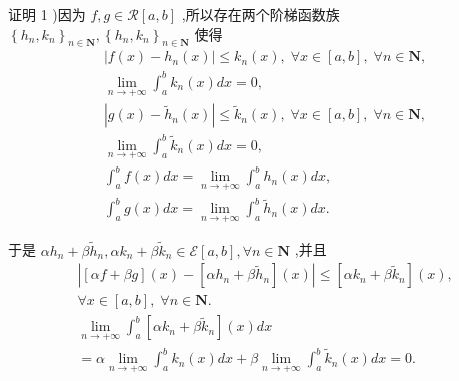证明 1 )因为 $f,g \in  \mathcal{R}\left\lbrack  {a,b}\right\rbrack$ ,所以存在两个阶梯函数族 ${\left\{  {h}_{n},{k}_{n}\right\}  }_{n \in  \mathbf{N}},{\left\{  {h}_{n},{k}_{n}\right\}  }_{n \in  \mathbf{N}}$ 使得
\begin{align*}
	&\left| {f\left( x\right)  - {h}_{n}\left( x\right) }\right|  \leq  {k}_{n}\left( x\right) ,\;\forall x \in  \left\lbrack  {a,b}\right\rbrack  ,\;\forall n \in  \mathbf{N},\\
	&\mathop{\lim }\limits_{{n \rightarrow   + \infty }}{\int }_{a}^{b}{k}_{n}\left( x\right) {dx} = 0,\\
	&\left| {g\left( x\right)  - {\widetilde{h}}_{n}\left( x\right) }\right|  \leq  {\widetilde{k}}_{n}\left( x\right) ,\;\forall x \in  \left\lbrack  {a,b}\right\rbrack  ,\;\forall n \in  \mathbf{N},\\
	&\mathop{\lim }\limits_{{n \rightarrow   + \infty }}{\int }_{a}^{b}{\widetilde{k}}_{n}\left( x\right) {dx} = 0,\\
	&{\int }_{a}^{b}f\left( x\right) {dx} = \mathop{\lim }\limits_{{n \rightarrow   + \infty }}{\int }_{a}^{b}{h}_{n}\left( x\right) {dx},\\
	&{\int }_{a}^{b}g\left( x\right) {dx} = \mathop{\lim }\limits_{{n \rightarrow   + \infty }}{\int }_{a}^{b}{\widetilde{h}}_{n}\left( x\right) {dx}.
\end{align*}

于是 $\alpha {h}_{n} + \beta {\widetilde{h}}_{n},\alpha {k}_{n} + \beta {\widetilde{k}}_{n} \in  \mathcal{E}\left\lbrack  {a,b}\right\rbrack  ,\forall n \in  \mathbf{N}$ ,并且
\begin{align*}
	&\left| {\left\lbrack  {{\alpha f} + {\beta g}}\right\rbrack  \left( x\right)  - \left\lbrack  {\alpha {h}_{n} + \beta {\widetilde{h}}_{n}}\right\rbrack  \left( x\right) }\right|  \leq  \left\lbrack  {\alpha {k}_{n} + \beta {\widetilde{k}}_{n}}\right\rbrack  \left( x\right) ,\\
	&\forall x \in  \left\lbrack  {a,b}\right\rbrack  ,\;\forall n \in  \mathbf{N}.\\
	&\mathop{\lim }\limits_{{n \rightarrow   + \infty }}{\int }_{a}^{b}\left\lbrack  {\alpha {k}_{n} + \beta {\widetilde{k}}_{n}}\right\rbrack  \left( x\right) {dx}\\
	&= \alpha \mathop{\lim }\limits_{{n \rightarrow   + \infty }}{\int }_{a}^{b}{k}_{n}\left( x\right) {dx} + \beta \mathop{\lim }\limits_{{n \rightarrow   + \infty }}{\int }_{a}^{b}{\widetilde{k}}_{n}\left( x\right) {dx} = 0.
\end{align*}

